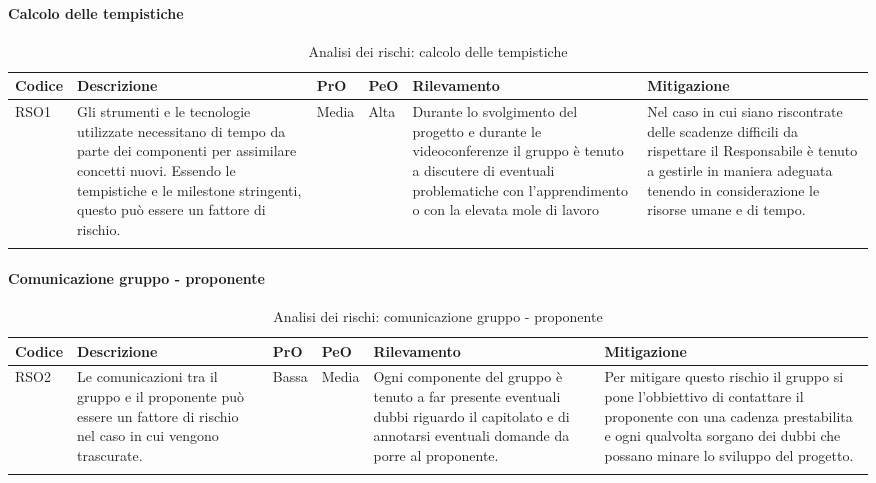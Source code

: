 \paragraph{Calcolo delle tempistiche}
\begin{center}

	\begin{longtable}{p{1cm}|p{4cm}|p{0.7cm}|p{0.7cm}|p{3cm}|p{4cm}}
		\arrayrulecolor{white}
		\hline
		\rowcolor{blue!20}
		\textbf{Codice} & 
		\textbf{Descrizione} &
		\textbf{PrO}  &
		\textbf{PeO}  &				        
		\textbf{Rilevamento} &
		\textbf{Mitigazione} \\
		\hline			
		RSO1 & Gli strumenti e le tecnologie utilizzate necessitano di tempo da parte dei componenti per assimilare concetti nuovi. Essendo le tempistiche e le milestone stringenti, questo può essere un fattore di rischio. & Media & Alta & Durante lo svolgimento del progetto e durante le videoconferenze il gruppo è tenuto a discutere di eventuali problematiche con l'apprendimento o con la elevata mole di lavoro & Nel caso in cui siano riscontrate delle scadenze difficili da rispettare il Responsabile è tenuto a gestirle in maniera adeguata tenendo in considerazione le risorse umane e di tempo. \\
		
		\rowcolor{white}
		\caption{Analisi dei rischi: calcolo delle tempistiche}
	\end{longtable}
\end{center}

\paragraph{Comunicazione gruppo - proponente}
\begin{center}

	\begin{longtable}{p{1cm}|p{4cm}|p{0.7cm}|p{0.7cm}|p{3cm}|p{4cm}}
		\arrayrulecolor{white}
		\hline
		\rowcolor{blue!20}
		\textbf{Codice} & 
		\textbf{Descrizione} &
		\textbf{PrO}  &
		\textbf{PeO}  &				        
		\textbf{Rilevamento} &
		\textbf{Mitigazione} \\
		\hline	
		RSO2 & Le comunicazioni tra il gruppo e il proponente può essere un fattore di rischio nel caso in cui vengono trascurate. & Bassa & Media & Ogni componente del gruppo è tenuto a far presente eventuali dubbi riguardo il capitolato e di annotarsi eventuali domande da porre al proponente. & Per mitigare questo rischio il gruppo si pone l'obbiettivo di contattare il proponente con una cadenza prestabilita e ogni qualvolta sorgano dei dubbi che possano minare lo sviluppo del progetto.  \\
		
		\rowcolor{white}
		\caption{Analisi dei rischi: comunicazione gruppo - proponente}
	\end{longtable}
\end{center}
\newpage
